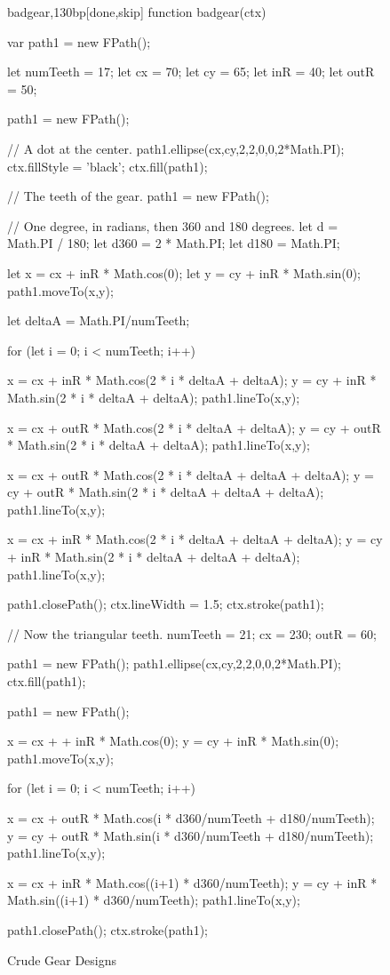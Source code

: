 \documentclass[10pt]{article}
\begin{document}
\begin{figure}[b!]
\begin{figput}{badgear,130bp}[done,skip]
function badgear(ctx) {
  
  var path1 = new FPath();
  
  let numTeeth = 17;
  let cx = 70;
  let cy = 65;
  let inR = 40;
  let outR = 50;
  
  path1 = new FPath();
  
  // A dot at the center.
  path1.ellipse(cx,cy,2,2,0,0,2*Math.PI);
  ctx.fillStyle = 'black';
  ctx.fill(path1);
  
  // The teeth of the gear.
  path1 = new FPath();
  
  // One degree, in radians, then 360 and 180 degrees.
  let d = Math.PI / 180;
  let d360 = 2 * Math.PI;
  let d180 = Math.PI;
  
  let x = cx + inR * Math.cos(0);
  let y = cy + inR * Math.sin(0);
  path1.moveTo(x,y);
  
  let deltaA = Math.PI/numTeeth;
  
  for (let i = 0; i < numTeeth; i++)
    {
      x = cx + inR * Math.cos(2 * i * deltaA + deltaA);
      y = cy + inR * Math.sin(2 * i * deltaA + deltaA);
      path1.lineTo(x,y);

      x = cx + outR * Math.cos(2 * i * deltaA + deltaA);
      y = cy + outR * Math.sin(2 * i * deltaA + deltaA);
      path1.lineTo(x,y);

      x = cx + outR * Math.cos(2 * i * deltaA + deltaA + deltaA);
      y = cy + outR * Math.sin(2 * i * deltaA + deltaA + deltaA);
      path1.lineTo(x,y);

      x = cx + inR * Math.cos(2 * i * deltaA + deltaA + deltaA);
      y = cy + inR * Math.sin(2 * i * deltaA + deltaA + deltaA);
      path1.lineTo(x,y);
    }
  
  path1.closePath();
  ctx.lineWidth = 1.5;
  ctx.stroke(path1);
  
  // Now the triangular teeth.
  numTeeth = 21;
  cx = 230;
  outR = 60;
  
  path1 = new FPath();
  path1.ellipse(cx,cy,2,2,0,0,2*Math.PI);
  ctx.fill(path1);
  
  path1 = new FPath();
  
  x = cx + + inR * Math.cos(0);
  y = cy + inR * Math.sin(0);
  path1.moveTo(x,y);
  
  for (let i = 0; i < numTeeth; i++)
    {
      x = cx + outR * Math.cos(i * d360/numTeeth + d180/numTeeth);
      y = cy + outR * Math.sin(i * d360/numTeeth + d180/numTeeth);
      path1.lineTo(x,y);
            
      x = cx + inR * Math.cos((i+1) * d360/numTeeth);
      y = cy + inR * Math.sin((i+1) * d360/numTeeth);
      path1.lineTo(x,y);
    }
  path1.closePath();
  ctx.stroke(path1);
}

\end{figput}
\caption{Crude Gear Designs}
\label{fig-gear-toy}
\end{figure}
\end{document}
